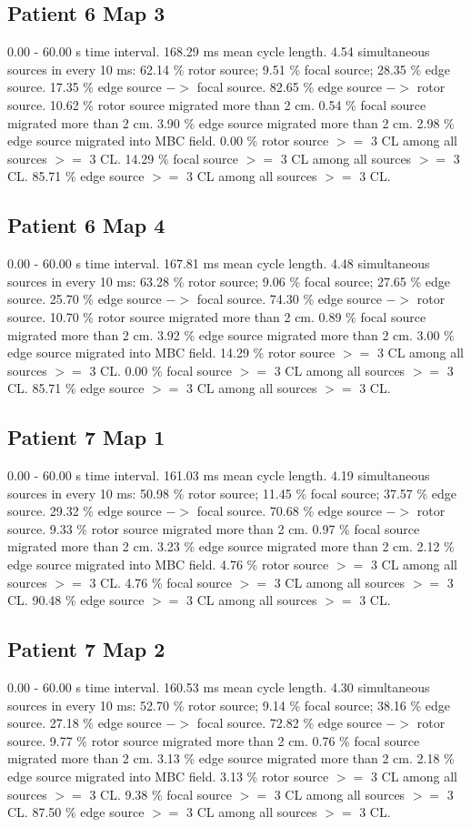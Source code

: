 \documentclass[journal,onecolumn]{IEEEtran} %
\begin{document}
\subsection{Patient 6 Map 3}
0.00 - 60.00 s time interval.
168.29 ms mean cycle length.
4.54 simultaneous sources in every 10 ms:
62.14 \% rotor source;
9.51 \% focal source;
28.35 \% edge source.
17.35 \% edge source $->$ focal source.
82.65 \% edge source $->$ rotor source.
10.62 \% rotor source migrated more than 2 cm.
0.54 \% focal source migrated more than 2 cm.
3.90 \% edge source migrated more than 2 cm.
2.98 \% edge source migrated into MBC field.
0.00 \% rotor source $>=$ 3 CL among all sources $>=$ 3 CL.
14.29 \% focal source $>=$ 3 CL among all sources $>=$ 3 CL.
85.71 \% edge source $>=$ 3 CL among all sources $>=$ 3 CL.

\subsection{Patient 6 Map 4}
0.00 - 60.00 s time interval.
167.81 ms mean cycle length.
4.48 simultaneous sources in every 10 ms:
63.28 \% rotor source;
9.06 \% focal source;
27.65 \% edge source.
25.70 \% edge source $->$ focal source.
74.30 \% edge source $->$ rotor source.
10.70 \% rotor source migrated more than 2 cm.
0.89 \% focal source migrated more than 2 cm.
3.92 \% edge source migrated more than 2 cm.
3.00 \% edge source migrated into MBC field.
14.29 \% rotor source $>=$ 3 CL among all sources $>=$ 3 CL.
0.00 \% focal source $>=$ 3 CL among all sources $>=$ 3 CL.
85.71 \% edge source $>=$ 3 CL among all sources $>=$ 3 CL.

\subsection{Patient 7 Map 1}
0.00 - 60.00 s time interval.
161.03 ms mean cycle length.
4.19 simultaneous sources in every 10 ms:
50.98 \% rotor source;
11.45 \% focal source;
37.57 \% edge source.
29.32 \% edge source $->$ focal source.
70.68 \% edge source $->$ rotor source.
9.33 \% rotor source migrated more than 2 cm.
0.97 \% focal source migrated more than 2 cm.
3.23 \% edge source migrated more than 2 cm.
2.12 \% edge source migrated into MBC field.
4.76 \% rotor source $>=$ 3 CL among all sources $>=$ 3 CL.
4.76 \% focal source $>=$ 3 CL among all sources $>=$ 3 CL.
90.48 \% edge source $>=$ 3 CL among all sources $>=$ 3 CL.

\subsection{Patient 7 Map 2}
0.00 - 60.00 s time interval.
160.53 ms mean cycle length.
4.30 simultaneous sources in every 10 ms:
52.70 \% rotor source;
9.14 \% focal source;
38.16 \% edge source.
27.18 \% edge source $->$ focal source.
72.82 \% edge source $->$ rotor source.
9.77 \% rotor source migrated more than 2 cm.
0.76 \% focal source migrated more than 2 cm.
3.13 \% edge source migrated more than 2 cm.
2.18 \% edge source migrated into MBC field.
3.13 \% rotor source $>=$ 3 CL among all sources $>=$ 3 CL.
9.38 \% focal source $>=$ 3 CL among all sources $>=$ 3 CL.
87.50 \% edge source $>=$ 3 CL among all sources $>=$ 3 CL.
\end{document}
